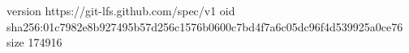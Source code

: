 version https://git-lfs.github.com/spec/v1
oid sha256:01c7982e8b927495b57d256c1576b0600c7bd4f7a6c05dc96f4d539925a0ce76
size 174916
